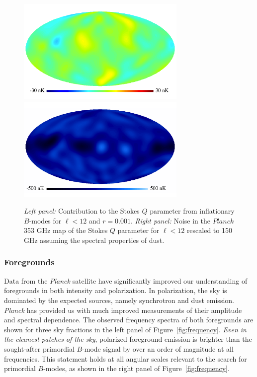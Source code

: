 \begin{figure}[h]
\begin{center}
\includegraphics[width=3.2in]{Figures/P15_2_12_rp001.pdf}
\includegraphics[width=3.2in]{Figures/P353_N_2_12.pdf}
\end{center}
\caption{{\it Left panel:} Contribution to the Stokes $Q$ parameter
  from inflationary $B$-modes for $\ell<12$ and $r=0.001$. {\it Right
    panel:} Noise in the $Planck$ 353 GHz map of the Stokes $Q$
  parameter for $\ell<12$ rescaled to 150\,GHz assuming the spectral
  properties of dust.}
\label{fig:Qrp001}
\end{figure}

\subsubsection{Foregrounds}

Data from the \emph{Planck} satellite have significantly improved our
understanding of foregrounds in both intensity and polarization.
In polarization, the sky is dominated by the expected sources, namely
synchrotron and dust emission. \emph{Planck} has provided us with much
improved measurements of their amplitude and spectral dependence. The
observed frequency spectra of both foregrounds are shown for three sky
fractions in the left panel of Figure~\ref{fig:frequency}.  \emph{Even
  in the cleanest patches of the sky}, polarized foreground emission
is brighter than the sought-after primordial $B$-mode signal by over
an order of magnitude at all frequencies.  This statement holds at all
angular scales relevant to the search for primordial $B$-modes, as
shown in the right panel of Figure~\ref{fig:frequency}.

